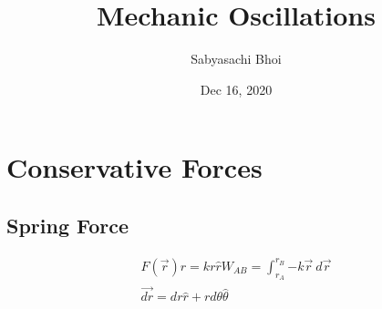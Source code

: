 \documentclass[12pt]{article}
\theoremstyle{definition}
\begin{document}
\title{Mechanic Oscillations}
\author{Sabyasachi Bhoi}
\date{ Dec 16, 2020 }
\maketitle

\section{Conservative Forces}

\subsection{Spring Force}

\begin{align*}
	F(\vec{r})\hat{r} = kr \hat{r}
	W_{AB} = \int_{r_A}^{r_B} {-k\vec{r}} \: d{\vec{r}} \\
	\vec{dr} = dr \hat{r} + r d\theta \hat{\theta} \\
\end{align*}
\end{document}
